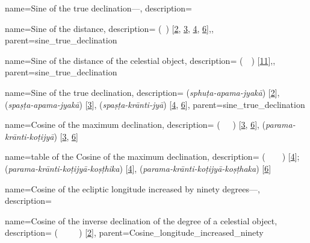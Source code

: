 {
        name={Sine of the true declination---},
        description={\phantom{x}\nopagebreak}
}

{
        name={Sine of the distance},
        description={ (\jayb\idafaconsonant\ \bud) [\hyperlink{PEpass2}{2}, \hyperlink{PEpass3}{3}, \hyperlink{PEpass4}{4}, \hyperlink{PEpass6}{6}],},
        parent={sine_true_declination}
}

{
        name={Sine of the distance of the celestial object},
        description={ (\jayb\idafaconsonant\ \bud\idafaconsonant\ \kawkab) [\hyperlink{PEpass11}{11}],},
        parent={sine_true_declination}
}

{
        name={Sine of the true declination},
        description={ (\textit{sphuṭa-apama-jyakā}) [\hyperlink{SEpass2}{2}], 
                     (\textit{spaṣṭa-apama-jyakā}) [\hyperlink{SEpass3}{3}], 
                     (\textit{spaṣṭa-krānti-jyā}) [\hyperlink{SEpass4}{4}, \hyperlink{SEpass6}{6}]},
        parent={sine_true_declination}
}

{
        name={Cosine of the maximum declination},
        description={ (\jayb\idafaconsonant\ \tamam\idafaconsonant\ \mayl\idafaconsonant\ \kulli) [\hyperlink{PEpass3}{3}, \hyperlink{PEpass6}{6}],
         (\textit{parama-krānti-koṭijyā}) [\hyperlink{SEpass3}{3}, \hyperlink{SEpass6}{6}]}
} 

{
        name={table of the Cosine of the maximum declination},
        description={\mbox{}  (\jadval\idafaconsonant\ \jayb\idafaconsonant\ \tamam\idafaconsonant\ \mayl\idafaconsonant\ \kulli) [\hyperlink{PEpass4}{4}];
         (\textit{parama-krānti-koṭijyā-koṣṭhika}) [\hyperlink{SEpass4}{4}],  (\textit{parama-krānti-koṭijyā-koṣṭhaka}) [\hyperlink{SEpass6}{6}]}
} 


{
        name={Cosine of the ecliptic longitude increased by ninety degrees---},
        description={\phantom{x}\nopagebreak}
}

{
        name={Cosine of the inverse declination of the degree of a celestial object},
        description={\newline{}  (\jayb\idafaconsonant\ \tamam\idafaconsonant\ \mayl\idafaconsonant\ \mankus\idafaconsonant\ \daraji\idafavowel\ \kawkab) [\hyperlink{PEpass2}{2}]},
        parent={Cosine_longitude_increased_ninety}
}


